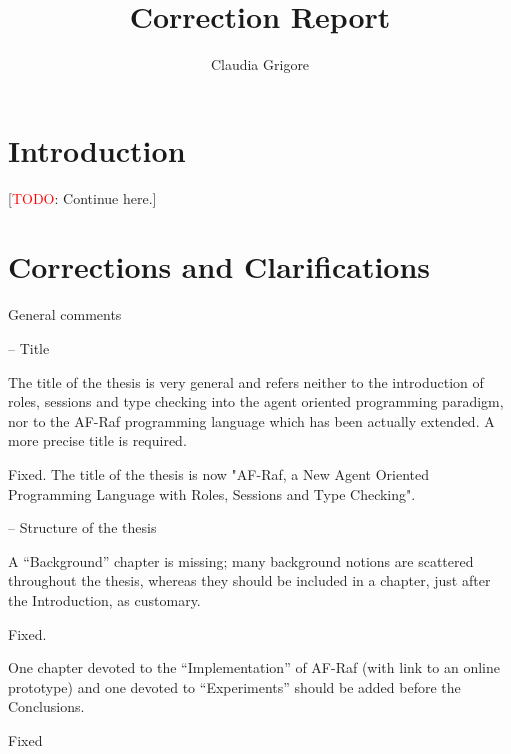 \documentclass{article}
\title{Correction Report}
\author{Claudia Grigore}
\newcommand{\todo}[1]{[\textcolor{red}{TODO}: #1]}
\newenvironment{them}{\noindent\begingroup\color{blue}}{\endgroup\par}
\begin{document}
\maketitle

\section{Introduction}

\todo{Continue here.}
\section{Corrections and Clarifications}

\begin{them}
General comments
\end{them}


\begin{them}
-- Title

The title of the thesis is very general and refers neither to the introduction
of roles, sessions and type checking into the agent oriented programming
paradigm, nor to the AF-Raf programming language which has been actually
extended. A more precise title is required.

\end{them}
Fixed. The title of the thesis is now "AF-Raf, a New Agent Oriented Programming
Language with Roles, Sessions and Type Checking".

\begin{them}

-- Structure of the thesis

A “Background” chapter is missing; many background notions are scattered
throughout the thesis, whereas they should be included in a chapter, just after
the Introduction, as customary.

\end{them}
Fixed.

\begin{them}

One chapter devoted to the “Implementation” of AF-Raf (with link to an online
prototype) and one devoted to “Experiments” should be added before the
Conclusions.

\end{them}
Fixed
\end{document}
